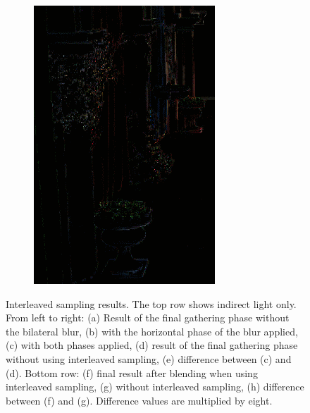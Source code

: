\begin{figure}[htb]
\begin{subfigure}[b]{0.333\textwidth}
        \includegraphics[width=.95\textwidth]{screenshots/interleaved_difference_shaded}%
        \caption{}
        \label{fig:results:interleaved_difference_shaded}%
    \end{subfigure}%
\vspace{-5pt}
      \caption{Interleaved sampling results. The top row shows indirect light only. From left to right: (a) Result of the final gathering phase without the bilateral blur, (b) with the horizontal phase of the blur applied, (c) with both phases applied, (d) result of the final gathering phase without using interleaved sampling, (e) difference between (c) and (d). Bottom row: (f) final result after blending when using interleaved sampling, (g) without interleaved sampling, (h) difference between (f) and (g). Difference values are multiplied by eight.}
      \label{fig:results:interleaved_quality}
\end{figure}


